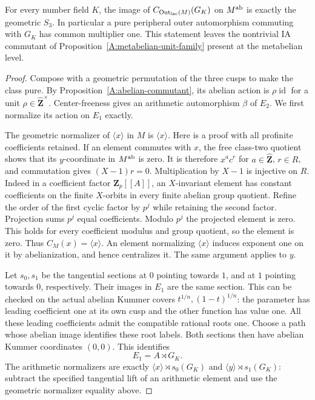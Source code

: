 \begin{proposition}
\label{A:metabelian-multiplier}
For every number field $K$, the image of
$C_{\operatorname{Out}_{\rm lac}(M)}(G_K)$ on
$M^{\rm ab}$ is exactly the geometric $S_3$.
In particular a pure peripheral outer automorphism
commuting with $G_K$ has common multiplier one.
This statement leaves the nontrivial IA commutant of
Proposition~\ref{A:metabelian-unit-family} present at
the metabelian level.
\end{proposition}
\begin{proof}
Compose with a geometric permutation of the three cusps
to make the class pure. By
Proposition~\ref{A:abelian-commutant}, its abelian action
is $\rho\operatorname{id}$ for a unit
$\rho\in\widehat{\mathbf Z}^{\times}$. Center-freeness
gives an arithmetic automorphism $\beta$ of $E_2$.
We first normalize its action on $E_1$ exactly.

The geometric normalizer of $\langle x\rangle$ in $M$
is $\langle x\rangle$. Here is a proof with all
profinite coefficients retained. If an element commutes
with $x$, the free class-two quotient shows that its
$y$-coordinate in $M^{\rm ab}$ is zero. It is therefore
$x^a c^r$ for $a\in\widehat{\mathbf Z}$, $r\in R$,
and commutation gives $(X-1)r=0$. Multiplication by
$X-1$ is injective on $R$. Indeed in a coefficient
factor $\mathbf Z_p[[A]]$, an $X$-invariant element has
constant coefficients on the finite $X$-orbits in
every finite abelian group quotient. Refine the order
of the first cyclic factor by $p^j$ while retaining
the second factor. Projection sums $p^j$ equal
coefficients. Modulo $p^j$ the projected element is
zero. This holds for every coefficient modulus and
group quotient, so the element is zero. Thus
$C_M(x)=\langle x\rangle$. An element normalizing
$\langle x\rangle$ induces exponent one on it by
abelianization, and hence centralizes it. The same
argument applies to $y$.

Let $s_0,s_1$ be the tangential sections at $0$ pointing
towards $1$, and at $1$ pointing towards $0$,
respectively. Their images in $E_1$ are the same
section. This can be checked on the actual abelian
Kummer covers $t^{1/n},(1-t)^{1/n}$: the parameter
has leading coefficient one at its own cusp and the
other function has value one. All these leading
coefficients admit the compatible rational roots one.
Choose a path whose abelian image identifies these
root labels. Both sections then have abelian Kummer
coordinates $(0,0)$. This identifies
\[
              E_1=A\rtimes G_K.
\]
The arithmetic normalizers are exactly
$\langle x\rangle\rtimes s_0(G_K)$ and
$\langle y\rangle\rtimes s_1(G_K)$: subtract the
specified tangential lift of an arithmetic element
and use the geometric normalizer equality above.


\end{proof}
